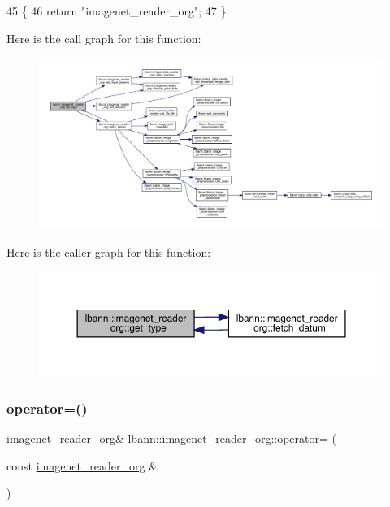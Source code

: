 \begin{DoxyCode}
45                                       \{
46     \textcolor{keywordflow}{return} \textcolor{stringliteral}{"imagenet\_reader\_org"};
47   \}
\end{DoxyCode}
Here is the call graph for this function\+:\nopagebreak
\begin{figure}[H]
\begin{center}
\leavevmode
\includegraphics[width=350pt]{classlbann_1_1imagenet__reader__org_ade6e7e9bc1a3f9562c0f274a3d665e0a_cgraph}
\end{center}
\end{figure}
Here is the caller graph for this function\+:\nopagebreak
\begin{figure}[H]
\begin{center}
\leavevmode
\includegraphics[width=350pt]{classlbann_1_1imagenet__reader__org_ade6e7e9bc1a3f9562c0f274a3d665e0a_icgraph}
\end{center}
\end{figure}
\mbox{\label{classlbann_1_1imagenet__reader__org_ab0f8949275ef71ef3f9d9bdb617440c4}} 
\subsubsection{\texorpdfstring{operator=()}{operator=()}}
{\footnotesize\ttfamily \hyperlink{classlbann_1_1imagenet__reader__org}{imagenet\+\_\+reader\+\_\+org}\& lbann\+::imagenet\+\_\+reader\+\_\+org\+::operator= (\begin{DoxyParamCaption}\item[{const \hyperlink{classlbann_1_1imagenet__reader__org}{imagenet\+\_\+reader\+\_\+org} \&}]{ }\end{DoxyParamCaption})\hspace{0.3cm}{\ttfamily [default]}}

